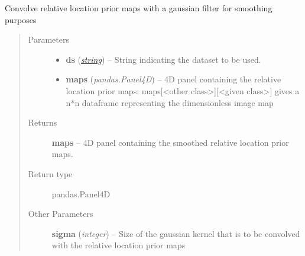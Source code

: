 \documentclass[letterpaper,10pt,english]{sphinxmanual}
\begin{document}
\begin{fulllineitems}
\label{classification:flamingo.classification.features.relativelocation.smooth_maps}
Convolve relative location prior maps with a gaussian filter for smoothing purposes
\begin{quote}\begin{description}
\item[{Parameters}] \leavevmode\begin{itemize}
\item {} 
\textbf{ds} (\href{http://docs.python.org/library/string.html\#module-string}{\emph{string}}) -- String indicating the dataset to be used.

\item {} 
\textbf{maps} (\emph{pandas.Panel4D}) -- 4D panel containing the relative location prior maps: maps{[}\textless{}other class\textgreater{}{]}{[}\textless{}given class\textgreater{}{]}
gives a n*n dataframe representing the dimensionless image map

\end{itemize}

\item[{Returns}] \leavevmode
\textbf{maps} --
4D panel containing the smoothed relative location prior maps.

\item[{Return type}] \leavevmode
pandas.Panel4D

\item[{Other Parameters}] \leavevmode
\textbf{sigma} (\emph{integer}) --
Size of the gaussian kernel that is to be convolved with the relative location prior maps

\end{description}\end{quote}

\end{fulllineitems}

\end{document}
